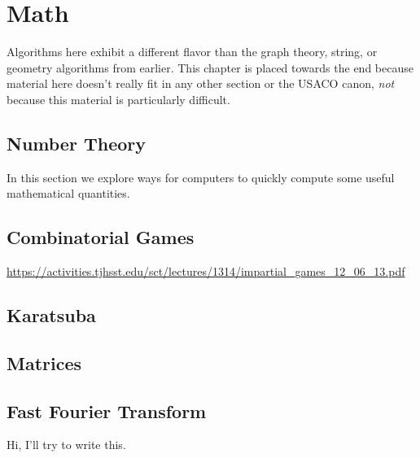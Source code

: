 \chapter{Math}

Algorithms here exhibit a different flavor than the graph theory, string, or geometry algorithms from earlier. This chapter is placed towards the end because material here doesn't really fit in any other section or the USACO canon, \textit{not} because this material is particularly difficult.

\section{Number Theory}

In this section we explore ways for computers to quickly compute some useful mathematical quantities.

\section{Combinatorial Games}

\url{https://activities.tjhsst.edu/sct/lectures/1314/impartial_games_12_06_13.pdf}

\section{Karatsuba}

\section{Matrices}

\section{Fast Fourier Transform}

Hi, I'll try to write this.